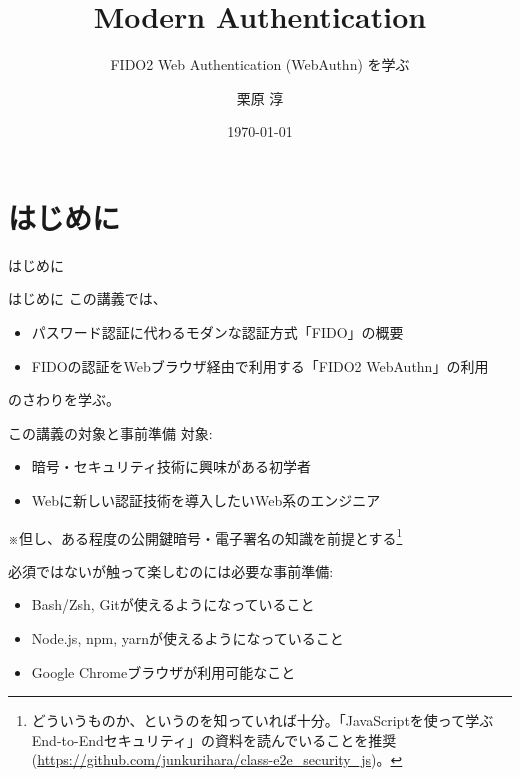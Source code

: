 \documentclass[12pt,dvipdfmx,uplatex]{beamer}
\title[Modern Authentication]{Modern Authentication}
\subtitle{FIDO2 Web Authentication (WebAuthn) を学ぶ}
\author[Jun Kurihara]{栗原 淳}
\institute[U-Hyogo/Zettant]{兵庫県立大学 大学院応用情報科学研究科 \\ 株式会社ゼタント}
\date[\today]{\today}
\begin{document}
\begin{frame}
\titlepage
\end{frame}

\section{はじめに}
\begin{frame}
 \centering
 {\Large はじめに}
\end{frame}

\begin{frame}{はじめに}
この講義では、
\begin{itemize}
 \item パスワード認証に代わるモダンな認証方式「FIDO」の概要
 \item FIDOの認証をWebブラウザ経由で利用する「FIDO2 WebAuthn」の利用
\end{itemize}
のさわりを学ぶ。
\end{frame}

\begin{frame}{この講義の対象と事前準備}
対象:
\begin{itemize}
\item 暗号・セキュリティ技術に興味がある初学者
\item Webに新しい認証技術を導入したいWeb系のエンジニア
\end{itemize}

\vspace{2ex}

※但し、ある程度の公開鍵暗号・電子署名の知識を前提とする\footnote[frame]{\scriptsize どういうものか、というのを知っていれば十分。「JavaScriptを使って学ぶEnd-to-Endセキュリティ」の資料を読んでいることを推奨 (\url{https://github.com/junkurihara/class-e2e_security_js})。}

\vspace{2ex}

必須ではないが触って楽しむのには必要な事前準備:
\begin{itemize}
\item Bash/Zsh, Gitが使えるようになっていること
\item Node.js, npm, yarnが使えるようになっていること
\item Google Chromeブラウザが利用可能なこと
\end{itemize}
\end{frame}



\end{document}
